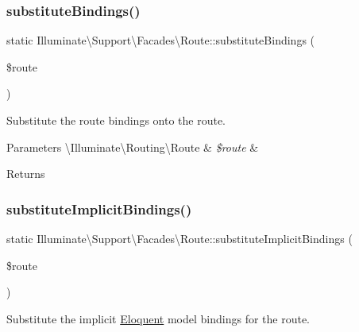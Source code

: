 \subsubsection{\texorpdfstring{substitute\+Bindings()}{substituteBindings()}}
{\footnotesize\ttfamily static Illuminate\textbackslash{}\+Support\textbackslash{}\+Facades\textbackslash{}\+Route\+::substitute\+Bindings (\begin{DoxyParamCaption}\item[{}]{\$route }\end{DoxyParamCaption})\hspace{0.3cm}{\ttfamily [static]}}

Substitute the route bindings onto the route.


\begin{DoxyParams}[1]{Parameters}
\textbackslash{}\+Illuminate\textbackslash{}\+Routing\textbackslash{}\+Route & {\em \$route} & \\
\hline
\end{DoxyParams}
\begin{DoxyReturn}{Returns}

\end{DoxyReturn}
\mbox{\label{class_illuminate_1_1_support_1_1_facades_1_1_route_a8b47baf3e67a44458d5359a653250714}} 
\subsubsection{\texorpdfstring{substitute\+Implicit\+Bindings()}{substituteImplicitBindings()}}
{\footnotesize\ttfamily static Illuminate\textbackslash{}\+Support\textbackslash{}\+Facades\textbackslash{}\+Route\+::substitute\+Implicit\+Bindings (\begin{DoxyParamCaption}\item[{}]{\$route }\end{DoxyParamCaption})\hspace{0.3cm}{\ttfamily [static]}}

Substitute the implicit \mbox{\hyperlink{class_eloquent}{Eloquent}} model bindings for the route.


